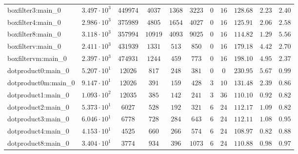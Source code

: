 \begin{tabular}{|l|c|c|c|c|c|c|c|c|c|c|}
boxfilter3:main\_0             & $ 3.497 \cdot 10^{3} $ & $ 449974   $ & $ 4037   $ & $ 1368   $ & $ 3223   $ & $ 0    $ & $ 16   $ & $ 128.68      $ & $ 2.23    $ & $ 2.40    $ \\
boxfilter4:main\_0             & $ 2.986 \cdot 10^{3} $ & $ 375989   $ & $ 4805   $ & $ 1654   $ & $ 4027   $ & $ 0    $ & $ 16   $ & $ 125.91      $ & $ 2.06    $ & $ 2.58    $ \\
boxfilter8:main\_0             & $ 3.118 \cdot 10^{3} $ & $ 357994   $ & $ 10919  $ & $ 4093   $ & $ 9025   $ & $ 0    $ & $ 16   $ & $ 114.82      $ & $ 1.29    $ & $ 5.56    $ \\
boxfilterv:main\_0             & $ 2.411 \cdot 10^{3} $ & $ 431939   $ & $ 1331   $ & $ 513    $ & $ 850    $ & $ 0    $ & $ 16   $ & $ 179.18      $ & $ 4.42    $ & $ 2.70    $ \\
boxfiltervm:main\_0            & $ 2.397 \cdot 10^{3} $ & $ 474931   $ & $ 1244   $ & $ 459    $ & $ 773    $ & $ 0    $ & $ 16   $ & $ 198.10      $ & $ 4.95    $ & $ 2.37    $ \\
dotproduct0:main\_0            & $ 5.207 \cdot 10^{1} $ & $ 12026    $ & $ 817    $ & $ 248    $ & $ 381    $ & $ 0    $ & $ 0    $ & $ 230.95      $ & $ 5.67    $ & $ 0.99    $ \\
dotproduct0m:main\_0           & $ 9.147 \cdot 10^{1} $ & $ 12026    $ & $ 391    $ & $ 159    $ & $ 428    $ & $ 3    $ & $ 10   $ & $ 131.48      $ & $ 2.39    $ & $ 0.86    $ \\
dotproduct1:main\_0            & $ 1.093 \cdot 10^{2} $ & $ 12035    $ & $ 385    $ & $ 142    $ & $ 241    $ & $ 3    $ & $ 36   $ & $ 110.10      $ & $ 0.92    $ & $ 0.82    $ \\
dotproduct2:main\_0            & $ 5.373 \cdot 10^{1} $ & $ 6027     $ & $ 528    $ & $ 192    $ & $ 321    $ & $ 6    $ & $ 24   $ & $ 112.17      $ & $ 1.09    $ & $ 0.82    $ \\
dotproduct3:main\_0            & $ 6.046 \cdot 10^{1} $ & $ 6778     $ & $ 728    $ & $ 284    $ & $ 643    $ & $ 6    $ & $ 24   $ & $ 112.11      $ & $ 1.08    $ & $ 0.95    $ \\
dotproduct4:main\_0            & $ 4.153 \cdot 10^{1} $ & $ 4525     $ & $ 660    $ & $ 266    $ & $ 574    $ & $ 6    $ & $ 24   $ & $ 108.97      $ & $ 0.82    $ & $ 0.88    $ \\
dotproduct8:main\_0            & $ 3.404 \cdot 10^{1} $ & $ 3774     $ & $ 934    $ & $ 396    $ & $ 1073   $ & $ 6    $ & $ 24   $ & $ 110.88      $ & $ 0.98    $ & $ 0.97    $ \\

\end{tabular}
